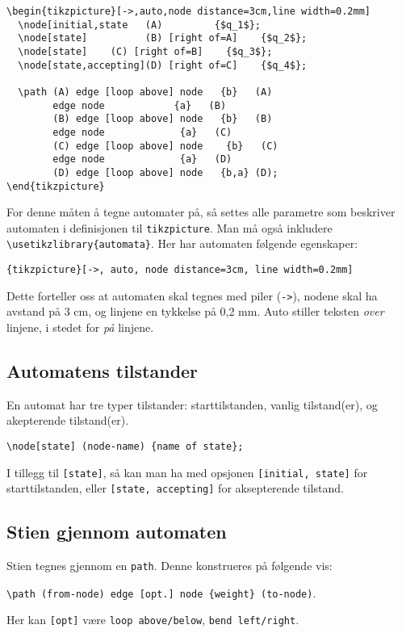 \documentclass[12pt, a4paper]{article}
\begin{document}
\begin{Verbatim}[fontsize=\small, frame=single]
\begin{tikzpicture}[->,auto,node distance=3cm,line width=0.2mm]
  \node[initial,state   (A) 		{$q_1$};
  \node[state]          (B) [right of=A]    {$q_2$};
  \node[state]	  (C) [right of=B]    {$q_3$};
  \node[state,accepting](D) [right of=C]    {$q_4$};

  \path (A) edge [loop above] node 	 {b}   (A)
	    edge node      		 {a}   (B)
        (B) edge [loop above] node 	 {b}   (B)
	    edge node   	  	  {a}   (C)
        (C) edge [loop above] node	  {b}   (C)
	    edge node 	    	  {a}   (D)
        (D) edge [loop above] node 	 {b,a} (D);
\end{tikzpicture}
\end{Verbatim}


For denne måten å tegne automater på, så settes alle parametre som beskriver automaten i definisjonen til \texttt{tikzpicture}. Man må også inkludere \texttt{\textbackslash usetikzlibrary\{automata\}}.
Her har automaten følgende egenskaper:
\begin{center}
\texttt{\{tikzpicture\}[->, auto, node distance=3cm, line width=0.2mm]}
\end{center}
Dette forteller oss at automaten skal tegnes med piler (\texttt{->}), nodene skal ha avstand på 3 cm, og linjene en tykkelse på 0,2 mm. Auto stiller teksten \textit{over} linjene, i stedet for \textit{på} linjene.

\subsection*{Automatens tilstander} En automat har tre typer tilstander: starttilstanden, vanlig tilstand(er), og akepterende tilstand(er).
\begin{center}
\texttt{\textbackslash node[state] (node-name) \{name of state\};}
\end{center}
I tillegg til \texttt{[state]}, så kan man ha med opsjonen \texttt{[initial, state]} for starttilstanden, eller \texttt{[state, accepting]} for aksepterende tilstand.

\subsection*{Stien gjennom automaten}
Stien tegnes gjennom en \texttt{path}. Denne konstrueres på følgende vis:
\begin{center}
\texttt{\textbackslash path (from-node) edge [opt.] node \{weight\} (to-node)}.
\end{center}
Her kan \texttt{[opt]} være \texttt{loop above/below}, \texttt{bend left/right}.
\end{document}
